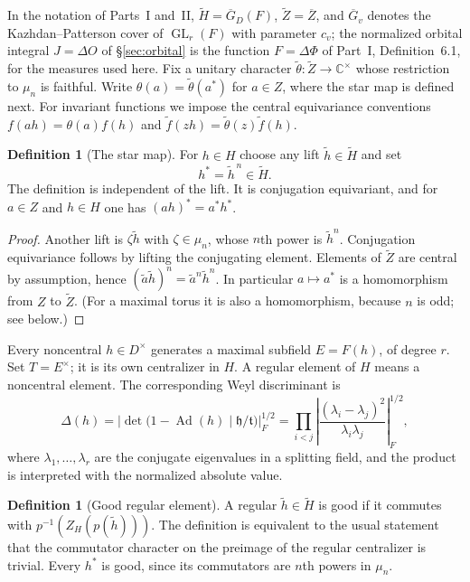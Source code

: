\documentclass[11pt]{article}
\newcommand{\C}{\mathbb C}
\newcommand{\GL}{\operatorname{GL}}
\newcommand{\tH}{\widetilde H}
\newcommand{\tZ}{\widetilde Z}
\newcommand{\Gb}{\overline{G}}\newcommand{\GDb}{\overline{G}_D}\newcommand{\Zb}{\overline{Z}}
\theoremstyle{plain}
\theoremstyle{definition}
\newtheorem{definition}[theorem]{Definition}
\begin{document}
In the notation of Parts~I and~II, $\tH=\GDb(F)$, $\tZ=\Zb$, and $\Gb_v$ denotes the Kazhdan--Patterson cover of $\GL_r(F)$ with parameter $c_v$; the normalized orbital integral $J=\Delta O$ of \S\ref{sec:orbital} is the function $F=\Delta\Phi$ of Part~I, Definition~6.1, for the measures used here. Fix a unitary character $\widetilde\theta:\tZ\to\C^\times$ whose restriction to $\mu_n$ is faithful. Write $\theta(a)=\widetilde\theta(a^*)$ for $a\in Z$, where the star map is defined next. For invariant functions we impose the central equivariance conventions $f(ah)=\theta(a)f(h)$ and $\widetilde f(zh)=\widetilde\theta(z)\widetilde f(h)$.

\begin{definition}[The star map]\label{def:star}
For $h\in H$ choose any lift $\widetilde h\in\tH$ and set
\begin{equation}\label{eq:star}
h^*=\widetilde h^{\,n}\in\tH.
\end{equation}
The definition is independent of the lift. It is conjugation equivariant, and for $a\in Z$ and $h\in H$ one has $(ah)^*=a^*h^*$.
\end{definition}
\begin{proof}
Another lift is $\zeta\widetilde h$ with $\zeta\in\mu_n$, whose $n$th power is $\widetilde h^n$. Conjugation equivariance follows by lifting the conjugating element. Elements of $\tZ$ are central by assumption, hence $(\widetilde a\widetilde h)^n=\widetilde a^n\widetilde h^n$. In particular $a\mapsto a^*$ is a homomorphism from $Z$ to $\tZ$. (For a maximal torus it is also a homomorphism, because $n$ is odd; see below.)
\end{proof}

Every noncentral $h\in D^\times$ generates a maximal subfield $E=F(h)$, of degree $r$. Set $T=E^\times$; it is its own centralizer in $H$. A regular element of $H$ means a noncentral element. The corresponding Weyl discriminant is
\begin{equation}\label{eq:disc}
\Delta(h)=\left|\det\bigl(1-\operatorname{Ad}(h)\mid \mathfrak h/\mathfrak t\bigr)\right|_F^{1/2}
=\prod_{i<j}\left|\frac{(\lambda_i-\lambda_j)^2}{\lambda_i\lambda_j}\right|_F^{1/2},
\end{equation}
where $\lambda_1,\dots,\lambda_r$ are the conjugate eigenvalues in a splitting field, and the product is interpreted with the normalized absolute value.

\begin{definition}[Good regular element]\label{def:good}
A regular $\widetilde h\in\tH$ is good if it commutes with $p^{-1}(Z_H(p(\widetilde h)))$. The definition is equivalent to the usual statement that the commutator character on the preimage of the regular centralizer is trivial. Every $h^*$ is good, since its commutators are $n$th powers in $\mu_n$.
\end{definition}
\end{document}
